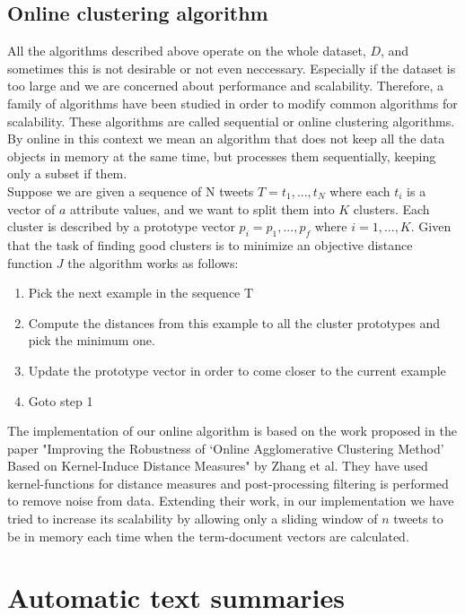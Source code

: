 \subsection{Online clustering algorithm}
All the algorithms described above operate on the whole dataset, $D$, and sometimes this is not desirable or not even neccessary. Especially if the dataset is too large and we are concerned about performance and scalability. Therefore, a family of algorithms have been studied in order to modify common algorithms for scalability. These algorithms are called sequential or online clustering algorithms. By online in this context we mean an algorithm that does not keep all the data objects in memory at the same time, but processes them sequentially, keeping only a subset if them.\\
Suppose we are given a sequence of N tweets $T = {t_1, ..., t_N}$ where each $t_i$ is a vector of $a$ attribute values, and we want to split them into $K$ clusters. Each cluster is described by a prototype vector $p_i = {p_1, ..., p_f}$ where $i = 1, ..., K$. Given that the task of finding good clusters is to minimize an objective distance function $J$ the algorithm works as follows:
\begin{enumerate}
   \item Pick the next example in the sequence T
   \item Compute the distances from this example to all the cluster prototypes and pick the minimum one.
   \item Update the prototype vector in order to come closer to the current example  
   \item Goto step 1  
 \end{enumerate} 
 
The implementation of our online algorithm is based on the work proposed in the paper "Improving the Robustness of ‘Online Agglomerative Clustering Method’ Based on Kernel-Induce Distance Measures" by Zhang et al. They have used kernel-functions for distance measures and post-processing filtering is performed to remove noise from data. Extending their work, in our implementation we have tried to increase its scalability by allowing only a sliding window of $n$ tweets to be in memory each time when the term-document vectors are calculated. 

\section{Automatic text summaries}\label{SummaryGen}

